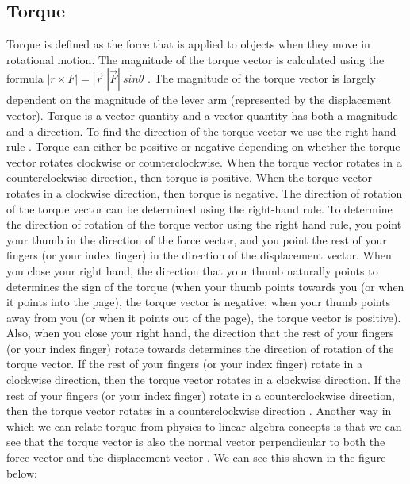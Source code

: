 \documentclass{turabian-researchpaper}
\begin{document}
\subsection{Torque} 

Torque is defined as the force that is applied to objects when they move in rotational motion. The magnitude of the torque vector is calculated using the formula \(\left\lvert r \times F \right\rvert = \left\lvert \overrightarrow{r} \right\rvert \left\lvert \overrightarrow{F} \right\rvert\ sin{\theta}\) \cite[p.$\Tilde{496}$]{UniversityPhysicsVolumeONE2024}. The magnitude of the torque vector is largely dependent on the magnitude of the lever arm (represented by the displacement vector). Torque is a vector quantity and a vector quantity has both a magnitude and a direction. To find the direction of the torque vector we use the right hand rule \cite[p.$\Tilde{496}$]{UniversityPhysicsVolumeONE2024}. Torque can either be positive or negative depending on whether the torque vector rotates clockwise or counterclockwise. When the torque vector rotates in a  counterclockwise direction, then torque is positive. When the torque vector rotates in a clockwise direction, then torque is negative. The direction of rotation of the torque vector can be determined using the right-hand rule. To determine the direction of rotation of the torque vector using the right hand rule, you point your thumb in the direction of the force vector, and you point the rest of your fingers (or your index finger) in the direction of the displacement vector. When you close your right hand, the direction that your thumb naturally points to determines the sign of the torque (when your thumb points towards you (or when it points into the page), the torque vector is negative; when your thumb points away from you (or when it points out of the page), the torque vector is positive). Also, when you close your right hand, the direction that the rest of your fingers (or your index finger) rotate towards determines the direction of rotation of the torque vector. If the rest of your fingers (or your index finger) rotate in a clockwise direction, then the torque vector rotates in a clockwise direction. If the rest of your fingers (or your index finger) rotate in a counterclockwise direction, then the torque vector rotates in a counterclockwise direction \cite{torquewikihow2024}. Another way in which we can relate torque from physics to linear algebra concepts is that we can see that the torque vector is also the normal vector perpendicular to both the force vector and the displacement vector \cite{torquekhanacademy2024}. We can see this shown in the figure below: 
\end{document}

